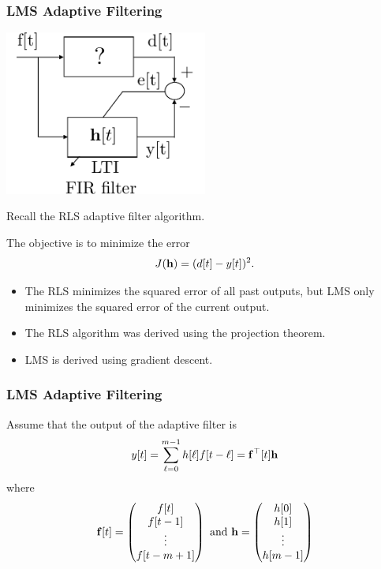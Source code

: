 \documentclass{beamer}
\begin{document}
\begin{frame}\frametitle{LMS Adaptive Filtering}
		
	\begin{center}
		\includegraphics[width=0.5\textwidth]
			{figures/chap14_adaptive_filter}
	\end{center}
	Recall the RLS adaptive filter algorithm.
	
	The objective is to minimize the error
	\[ 
		J(\mathbf{h}) = (d[t] - y[t])^2.
	\]
	
	\begin{itemize}
		\item The RLS minimizes the squared error of all past outputs, but LMS only minimizes the squared error of the current output.
		\item The RLS algorithm was derived using the projection theorem.
		\item LMS is derived using gradient descent.
	\end{itemize}
\end{frame}

\begin{frame}\frametitle{LMS Adaptive Filtering}
	Assume that the output of the adaptive filter is
	\[ 
		y[t] = \sum_{\ell = 0}^{m-1}h[\ell]f[t-\ell] = \mathbf{f}^\top[t]\mathbf{h}
	\]
	where
	\[
		\mathbf{f}[t] 
			= \begin{pmatrix}
	    		f[t]\\
	    		f[t-1]\\
	    		\vdots\\
	    		f[t-m+1]
	  		  \end{pmatrix}
	  	\text{ and }
		\mathbf{h}
			= \begin{pmatrix}
	    		h[0]\\
	    		h[1]\\
	    		\vdots\\
	    		h[m-1]
	  		  \end{pmatrix}
	\]
\end{frame}
\end{document}
